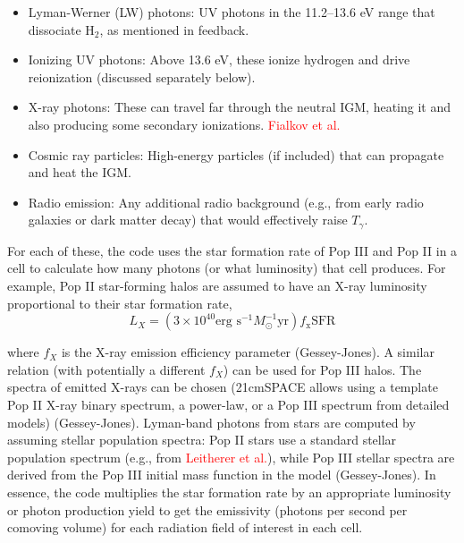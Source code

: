 \documentclass[floats,floatfix,showpacs,amssymb,prd,superscriptaddress,nofootinbib]{revtex4-2} %
\newcommand{\red}{\textcolor{red}}
\begin{document}
\begin{enumerate}
\begin{itemize}
        \item Lyman-Werner (LW) photons: UV photons in the 11.2–13.6 eV range that dissociate $\mathrm{H}_2$, as mentioned in feedback.

        \item Ionizing UV photons: Above 13.6 eV, these ionize hydrogen and drive reionization (discussed separately below).

        \item X-ray photons: These can travel far through the neutral IGM, heating it and also producing some secondary ionizations. \red{Fialkov et al.}

        \item Cosmic ray particles: High-energy particles (if included) that can propagate and heat the IGM.

        \item Radio emission: Any additional radio background (e.g., from early radio galaxies or dark matter decay) that would effectively raise $T_\gamma$.
    \end{itemize}

    For each of these, the code uses the star formation rate of Pop III and Pop II in a cell to calculate how many photons (or what luminosity) that cell produces. For example, Pop II star-forming halos are assumed to have an X-ray luminosity proportional to their star formation rate, 
    \begin{equation}
        L_X = (3\times10^{40} \text{erg s}^{-1} M_\odot^{-1}\text{yr}) f_{\text{x}} \text{SFR}
    \end{equation}
    
    where $f_X$ is the X-ray emission efficiency parameter (Gessey-Jones). A similar relation (with potentially a different $f_X$) can be used for Pop III halos. The spectra of emitted X-rays can be chosen (21cmSPACE allows using a template Pop II X-ray binary spectrum, a power-law, or a Pop III spectrum from detailed models) (Gessey-Jones). Lyman-band photons from stars are computed by assuming stellar population spectra: Pop II stars use a standard stellar population spectrum (e.g., from \red{Leitherer et al.}), while Pop III stellar spectra are derived from the Pop III initial mass function in the model (Gessey-Jones). In essence, the code multiplies the star formation rate by an appropriate luminosity or photon production yield to get the emissivity (photons per second per comoving volume) for each radiation field of interest in each cell.


\end{enumerate}
\end{document}
